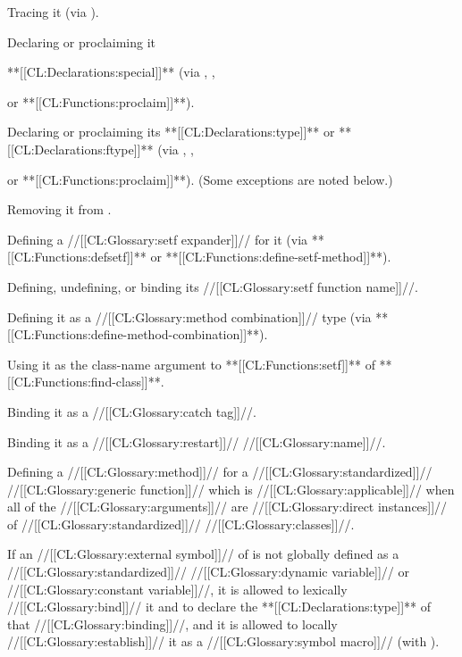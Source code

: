  Tracing it  (via ).

 Declaring or proclaiming it

	       **[[CL:Declarations:special]]** 	       (via ,  		    ,

		 or **[[CL:Functions:proclaim]]**).

 Declaring or proclaiming its **[[CL:Declarations:type]]** or **[[CL:Declarations:ftype]]** 	       (via ,  		    ,

		 or **[[CL:Functions:proclaim]]**). 	       (Some exceptions are noted below.)

 Removing it from .


 Defining a //[[CL:Glossary:setf expander]]// for it  	       (via **[[CL:Functions:defsetf]]** or **[[CL:Functions:define-setf-method]]**).

 Defining, undefining, or binding its //[[CL:Glossary:setf function name]]//.

 Defining it as a //[[CL:Glossary:method combination]]// type  		(via **[[CL:Functions:define-method-combination]]**).

 Using it as the class-name argument  	       to **[[CL:Functions:setf]]** of **[[CL:Functions:find-class]]**.

 Binding it as a //[[CL:Glossary:catch tag]]//.

 Binding it as a //[[CL:Glossary:restart]]// //[[CL:Glossary:name]]//.

 Defining a //[[CL:Glossary:method]]//  	       for a //[[CL:Glossary:standardized]]// //[[CL:Glossary:generic function]]//  	       which is //[[CL:Glossary:applicable]]// when all of the //[[CL:Glossary:arguments]]//
      	       are //[[CL:Glossary:direct instances]]// of //[[CL:Glossary:standardized]]// //[[CL:Glossary:classes]]//.

\endlist 


If an //[[CL:Glossary:external symbol]]// of  is not globally defined as a //[[CL:Glossary:standardized]]// //[[CL:Glossary:dynamic variable]]//  					      or //[[CL:Glossary:constant variable]]//, it is allowed to lexically //[[CL:Glossary:bind]]// it 
          and to declare the **[[CL:Declarations:type]]** of that //[[CL:Glossary:binding]]//,  and it is allowed to locally //[[CL:Glossary:establish]]// it as a //[[CL:Glossary:symbol macro]]//  (\eg with ).

